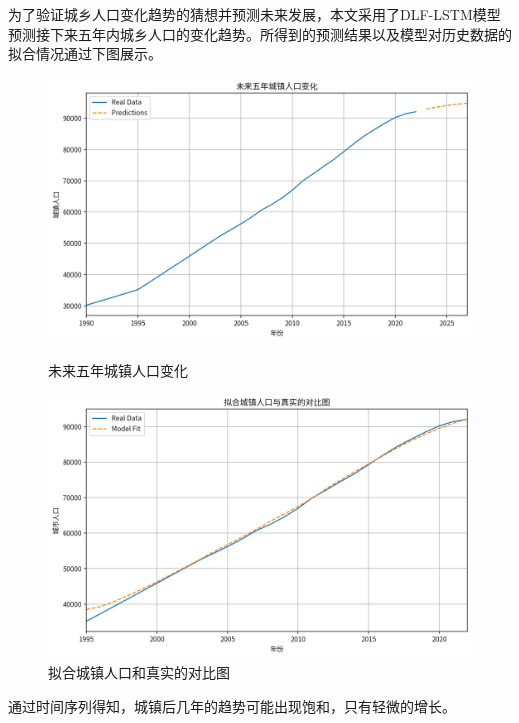 为了验证城乡人口变化趋势的猜想并预测未来发展，本文采用了DLF-LSTM模型预测接下来五年内城乡人口的变化趋势。所得到的预测结果以及模型对历史数据的拟合情况通过下图展示。
\begin{figure}[H]
    \centering
    \begin{minipage}{0.5\textwidth}
        \centering
        \includegraphics[width=\linewidth]{figures/2.png}
        \caption{未来五年城镇人口变化}
        \label{fig:population-change}
    \end{minipage}\hfill
    \begin{minipage}{0.5\textwidth}
        \centering
        \includegraphics[width=\linewidth]{figures/3.png}
        \caption{拟合城镇人口和真实的对比图}
        \label{fig:population_fit-vs-real}
    \end{minipage}
\end{figure}

通过时间序列得知，城镇后几年的趋势可能出现饱和，只有轻微的增长。

